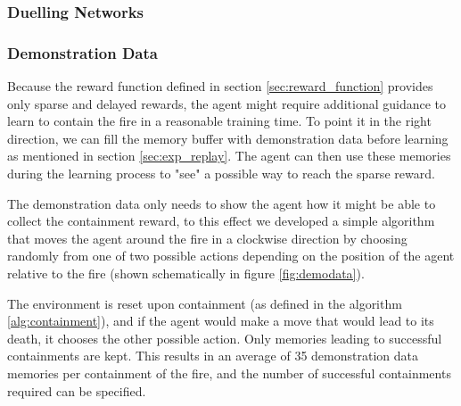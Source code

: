 


\subsubsection{Duelling Networks}\label{sec:duelling}




\subsubsection{Demonstration Data}\label{sec:demo_data}
Because the reward function defined in section \ref{sec:reward_function} provides only sparse and delayed rewards, the agent might require additional guidance to learn to contain the fire in a reasonable training time. To point it in the right direction, we can fill the memory buffer with demonstration data before learning as mentioned in section \ref{sec:exp_replay}. The agent can then use these memories during the learning process to "see" a possible way to reach the sparse reward.

The demonstration data only needs to show the agent how it might be able to collect the containment reward, to this effect we developed a simple algorithm that moves the agent around the fire in a clockwise direction by choosing randomly from one of two possible actions depending on the position of the agent relative to the fire (shown schematically in figure \ref{fig:demodata}). 

The environment is reset upon containment (as defined in the algorithm \ref{alg:containment}), and if the agent would make a move that would lead to its death, it chooses the other possible action. Only memories leading to successful containments are kept. This results in an average of 35 demonstration data memories per containment of the fire, and the number of successful containments required can be specified.


